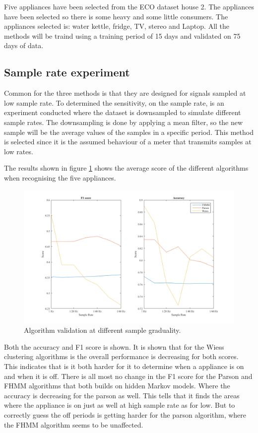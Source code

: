 Five appliances have been selected from the ECO dataset house 2. The appliances have been selected so there is some heavy and some little consumers. The appliances selected is: water kettle, fridge, TV, stereo and Laptop. All the methods will be traind using a training period of 15 days and validated on 75 days of data. 

\subsection{Sample rate experiment}
Common for the three methods is that they are designed for signals sampled at low sample rate. To determined the sensitivity, on the sample rate, is an experiment conducted where the dataset is downsampled to simulate different sample rates. The downsampling is done by applying a mean filter, so the new sample will be the average values of the samples in a specific period. This method is selected since it is the assumed behaviour of a meter that transmits samples at low rates. 

The results shown in figure \ref{fig:DSE} shows the average score of the different algorithms when recognising the five appliances. 

\begin{figure}[H]
\centering
\includegraphics[width=1\textwidth]{billeder/AlgoScoreNilm.png}
\caption{Algorithm validation at different sample graduality.}
\label{fig:DSE}
\end{figure}

Both the accuracy and F1 score is shown. It is shown that for the Wiess clustering algorithms is the overall performance is decreasing for both scores. This indicates that is it both harder for it to determine when a appliance is on and when it is off. There is all most no change in the F1 score for the Parson and FHMM algorithms that both builds on hidden Markov models. Where the accuracy is decreasing for the parson as well. This tells that it finds the areas where the appliance is on just as well at high sample rate as for low. But to correctly guess the off periods is getting harder for the parson algorithm, where the FHMM algorithm seems to be unaffected. 

